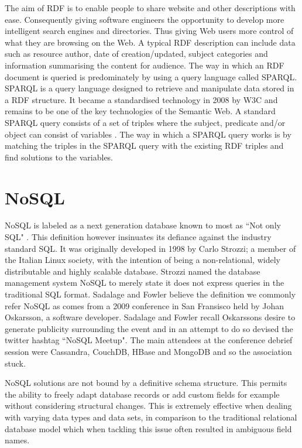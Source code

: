 The aim of RDF is to enable people to share website and other descriptions with ease. Consequently giving software engineers the opportunity to develop more intelligent search engines and directories. Thus giving Web users more control of what they are browsing on the Web. A typical RDF description can include data such as resource author, date of creation/updated, subject categories and information summarising the content for audience. The way in which an RDF document is queried is predominately by using a query language called SPARQL. SPARQL is a query language designed to retrieve and manipulate data stored in a RDF structure. It became a standardised technology in 2008 by W3C and remains to be one of the key technologies of the Semantic Web. A standard SPARQL query consists of a set of triples where the subject, predicate and/or object can consist of variables \cite{7}. The way in which a SPARQL query works is by matching the triples in the SPARQL query with the existing RDF triples and find solutions to the variables.

\section{NoSQL}\label{nosql}
NoSQL is labeled as a next generation database known to most as ``Not only SQL" \cite{nosql1}. This definition however insinuates its defiance against the industry standard SQL. It was originally developed in 1998 by Carlo Strozzi; a member of the Italian Linux society, with the intention of being a non-relational, widely distributable and highly scalable database. Strozzi named the database management system NoSQL to merely state it does not express queries in the traditional SQL format. Sadalage and Fowler believe the definition we commonly refer NoSQL as comes from a 2009 conference in San Fransisco held by Johan Oskarsson, a software developer. Sadalage and Fowler recall Oskarssons desire to generate publicity surrounding the event and in an attempt to do so devised the twitter hashtag ``NoSQL Meetup". The main attendees at the conference debrief session were Cassandra, CouchDB, HBase and MongoDB and so the association stuck. \cite{nosql1}

NoSQL solutions are not bound by a definitive schema structure. This permits the ability to freely adapt database records or add custom fields for example without considering structural changes. This is extremely effective when dealing with varying data types and data sets, in comparison to the traditional relational database model which when tackling this issue often resulted in ambiguous field names.  \cite{nosql1}

